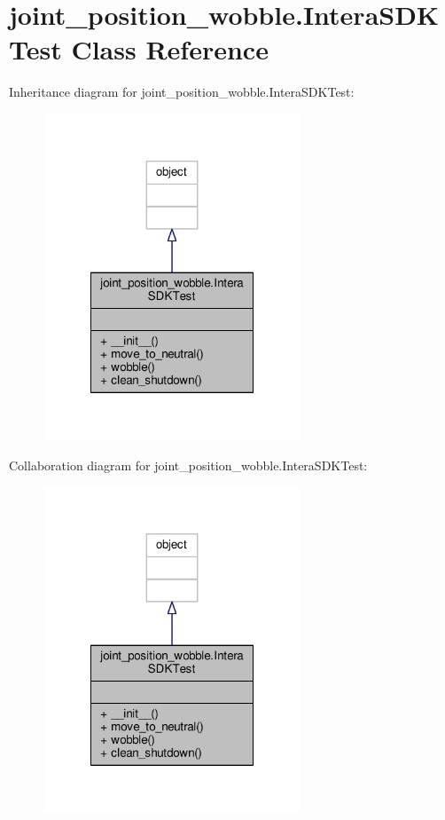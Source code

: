 \hypertarget{classjoint__position__wobble_1_1_intera_s_d_k_test}{\section{joint\-\_\-position\-\_\-wobble.\-Intera\-S\-D\-K\-Test Class Reference}
\label{classjoint__position__wobble_1_1_intera_s_d_k_test}
}


Inheritance diagram for joint\-\_\-position\-\_\-wobble.\-Intera\-S\-D\-K\-Test\-:\nopagebreak
\begin{figure}[H]
\begin{center}
\leavevmode
\includegraphics[width=216pt]{classjoint__position__wobble_1_1_intera_s_d_k_test__inherit__graph}
\end{center}
\end{figure}


Collaboration diagram for joint\-\_\-position\-\_\-wobble.\-Intera\-S\-D\-K\-Test\-:\nopagebreak
\begin{figure}[H]
\begin{center}
\leavevmode
\includegraphics[width=216pt]{classjoint__position__wobble_1_1_intera_s_d_k_test__coll__graph}
\end{center}
\end{figure}
